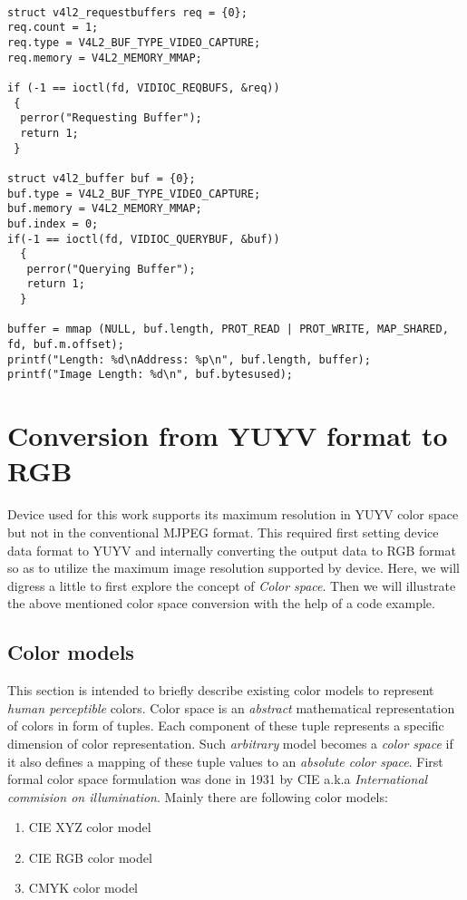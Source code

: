 \documentclass{article}
\begin{document}
\begin{lstlisting}[label=i_o,caption=Using memory mapped I/O]

struct v4l2_requestbuffers req = {0};
req.count = 1;
req.type = V4L2_BUF_TYPE_VIDEO_CAPTURE;
req.memory = V4L2_MEMORY_MMAP;

if (-1 == ioctl(fd, VIDIOC_REQBUFS, &req))
 {
  perror("Requesting Buffer");
  return 1;
 }

struct v4l2_buffer buf = {0};
buf.type = V4L2_BUF_TYPE_VIDEO_CAPTURE;
buf.memory = V4L2_MEMORY_MMAP;
buf.index = 0;
if(-1 == ioctl(fd, VIDIOC_QUERYBUF, &buf))
  {
   perror("Querying Buffer");
   return 1;
  }

buffer = mmap (NULL, buf.length, PROT_READ | PROT_WRITE, MAP_SHARED, fd, buf.m.offset);
printf("Length: %d\nAddress: %p\n", buf.length, buffer);
printf("Image Length: %d\n", buf.bytesused);

\end{lstlisting}


\section{Conversion from YUYV format to RGB}
Device used for this work supports its maximum resolution in YUYV color space but not in the conventional MJPEG format. This required first setting device data format to YUYV and internally converting the output data to RGB format so as to utilize the maximum image resolution supported by device. \newline
Here, we will digress a little to first explore the concept of \textit{Color space}. Then we will illustrate the above mentioned color space conversion with the help of a code example.

\subsection{Color models}
This section is intended to briefly describe existing color models to represent \textit{human perceptible} colors. Color space is an \textit{abstract} mathematical representation of colors in form of tuples. Each component of these tuple represents a specific dimension of color representation. Such \textit{arbitrary} model becomes a \textit{color space} if it also defines a mapping of these tuple values to an \textit{absolute color space}. \newline
First formal color space formulation was done in 1931 by CIE a.k.a \textit{International commision on illumination}. Mainly there are following color models:
\begin{enumerate}
\item CIE XYZ color model
\item CIE RGB color model
\item CMYK color model
\end{enumerate}
\end{document}
